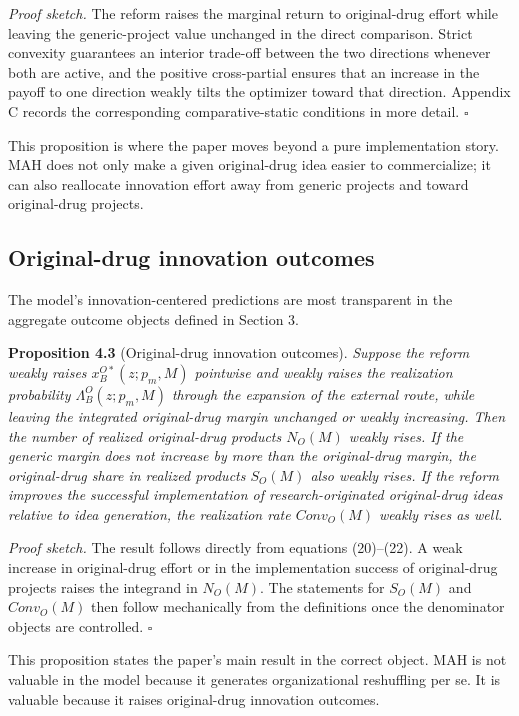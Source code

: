 \documentclass[12pt]{article}
\begin{document}
\textit{Proof sketch.} The reform raises the marginal return to original-drug effort while leaving the generic-project value unchanged in the direct comparison. Strict convexity guarantees an interior trade-off between the two directions whenever both are active, and the positive cross-partial ensures that an increase in the payoff to one direction weakly tilts the optimizer toward that direction. Appendix C records the corresponding comparative-static conditions in more detail. \hfill$\square$

This proposition is where the paper moves beyond a pure implementation story. MAH does
not only make a given original-drug idea easier to commercialize; it can also reallocate
innovation effort away from generic projects and toward original-drug projects.

\subsection{Original-drug innovation outcomes}

The model's innovation-centered predictions are most transparent in the aggregate outcome
objects defined in Section 3.

\textbf{Proposition 4.3} (Original-drug innovation outcomes). \textit{Suppose the reform weakly raises $x_B^{O*}(z;p_m,M)$ pointwise and weakly raises the realization probability $\Lambda_B^O(z;p_m,M)$ through the expansion of the external route, while leaving the integrated original-drug margin unchanged or weakly increasing. Then the number of realized original-drug products $N_O(M)$ weakly rises. If the generic margin does not increase by more than the original-drug margin, the original-drug share in realized products $S_O(M)$ also weakly rises. If the reform improves the successful implementation of research-originated original-drug ideas relative to idea generation, the realization rate $Conv_O(M)$ weakly rises as well.}

\textit{Proof sketch.} The result follows directly from equations (20)--(22). A weak increase in original-drug effort or in the implementation success of original-drug projects raises the integrand in $N_O(M)$. The statements for $S_O(M)$ and $Conv_O(M)$ then follow mechanically from the definitions once the denominator objects are controlled. \hfill$\square$

This proposition states the paper's main result in the correct object. MAH is not valuable in
the model because it generates organizational reshuffling per se. It is valuable because it
raises original-drug innovation outcomes.
\end{document}
